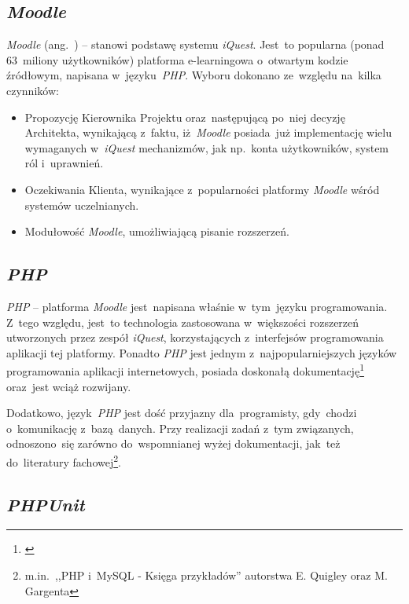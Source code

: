 \subsection{\textit{Moodle}}
\label{Chapter631}

\textit{Moodle} (ang.~) -- stanowi podstawę systemu \textit{iQuest}. Jest~to popularna (ponad 63~miliony użytkowników) platforma e-learningowa o~otwartym kodzie źródłowym, napisana w~języku~\emph{PHP}. Wyboru dokonano ze~względu na~kilka czynników:
\begin{itemize}
\item{Propozycję Kierownika Projektu oraz~następującą po~niej decyzję Architekta, wynikającą z~faktu, iż~\textit{Moodle} posiada~już implementację wielu wymaganych w~\textit{iQuest} mechanizmów, jak np.~konta użytkowników, system ról i~uprawnień.}
\item{Oczekiwania Klienta, wynikające z~popularności platformy \textit{Moodle} wśród systemów uczelnianych.}
\item{Modułowość \textit{Moodle}, umożliwiającą pisanie rozszerzeń.}
\end{itemize}

\subsection{\textit{PHP}}
\label{Chapter632}

\textit{PHP} -- platforma \textit{Moodle} jest~napisana właśnie w~tym~języku programowania. Z~tego względu, jest~to technologia zastosowana w~większości rozszerzeń utworzonych przez zespół \textit{iQuest}, korzystających z~interfejsów programowania aplikacji tej platformy. Ponadto \textit{PHP} jest jednym z~najpopularniejszych języków programowania aplikacji internetowych, posiada doskonałą dokumentację\footnote{\cite{Man:PHP}} oraz~jest wciąż rozwijany.

Dodatkowo, język~\textit{PHP} jest dość przyjazny dla~programisty, gdy~chodzi o~komunikację z~bazą~danych. Przy realizacji zadań z~tym związanych, odnoszono~się zarówno do~wspomnianej wyżej dokumentacji, jak~też do~literatury fachowej\footnote{m.in.~,,PHP i~MySQL - Księga przykładów'' autorstwa E. Quigley oraz M. Gargenta\cite{EQMG:PiMKp07}}.

\subsection{\textit{PHPUnit}}
\label{Chapter633}

